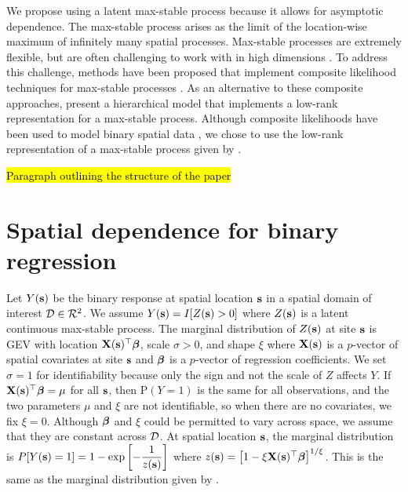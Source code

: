 \documentclass[11pt]{article}
\begin{document}
We propose using a latent max-stable process \citep{deHaan1984} because it allows for asymptotic dependence.
The max-stable process arises as the limit of the location-wise maximum of infinitely many spatial processes.
Max-stable processes are extremely flexible, but are often challenging to work with in high dimensions \citep{Wadsworth2014,Thibaud2013a}.
To address this challenge, methods have been proposed that implement composite likelihood techniques for max-stable processes \citep{Padoan2010,Genton2011,Huser2014}.
As an alternative to these composite approaches, \citet{Reich2012} present a hierarchical model that implements a low-rank representation for a max-stable process.
Although composite likelihoods have been used to model binary spatial data \citep{Heagerty1998}, we chose to use the low-rank representation of a max-stable process given by \citet{Reich2012}.

\hl{Paragraph outlining the structure of the paper}

\section{Spatial dependence for binary regression} \label{rbs:maxstab}
Let $Y(\mbox{\bf s})$ be the binary response at spatial location $\mbox{\bf s}$ in a spatial domain of interest ${\cal D} \in {\cal R}^2$.
We assume $Y(\mbox{\bf s}) = I[Z(\mbox{\bf s}) > 0]$ where $Z(\mbox{\bf s})$ is a latent continuous max-stable process.
The marginal distribution of $Z(\mbox{\bf s})$ at site $\mbox{\bf s}$ is GEV with location $\mbox{\bf X}(\mbox{\bf s})^\top \mbox{\boldmath $\beta$}$, scale $\sigma > 0$, and shape $\xi$ where $\mbox{\bf X}(\mbox{\bf s})$ is a $p$-vector of spatial covariates at site $\mbox{\bf s}$ and $\mbox{\boldmath $\beta$}$ is a $p$-vector of regression coefficients.
We set $\sigma = 1$ for identifiability because only the sign and not the scale of $Z$ affects $Y$.
If $\mbox{\bf X}(\mbox{\bf s})^\top \mbox{\boldmath $\beta$} = \mu$ for all $\mbox{\bf s}$, then P$(Y = 1)$ is the same for all observations, and the two parameters $\mu$ and $\xi$ are not identifiable, so when there are no covariates, we fix $\xi = 0$.
Although $\mbox{\boldmath $\beta$}$ and $\xi$ could be permitted to vary across space, we assume that they are constant across ${\cal D}$.
At spatial location $\mbox{\bf s}$, the marginal distribution is \mbox{$P[Y(\mbox{\bf s}) = 1] = 1 - \exp\left[ -\displaystyle\frac{ 1 }{ z(\mbox{\bf s})} \right]$} where $z(\mbox{\bf s}) = \left[1 - \xi \mbox{\bf X}(\mbox{\bf s})^\top \mbox{\boldmath $\beta$}\right]^{1 / \xi}$.
This is the same as the marginal distribution given by \citet{Wang2010}.
\end{document}

